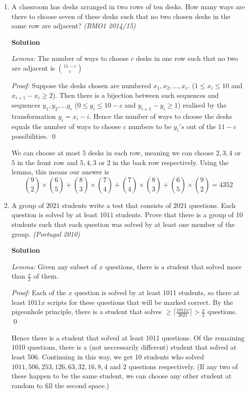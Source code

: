 \documentclass[10pt,a4paper]{article}
\begin{document}
\begin{enumerate}
\item A classroom has desks arranged in two rows of ten desks. How many ways are there to choose seven of these desks such that no two chosen desks in the same row are adjacent?
\textit{(BMO1 2014/15)}

\textbf{Solution} 

\textit{Lemma:} The number of ways to choose $c$ desks in one row such that no two are adjacent is $\binom{11-c}{c}$

\textit{Proof:} Suppose the desks chosen are numbered $x_1, x_2, ..., x_c$. ($1\leq x_i \leq 10$ and $x_{i+1}-x_i \geq 2$). Then there is a bijection between such sequences and sequences $y_1, y_2, ... y_c$  ($0\leq y_i\leq10-c$ and $y_{i+1}-y_i \geq1$) realised by the transformation $y_i = x_i - i$. Hence the number of ways to choose the desks equals the number of ways to choose $c$ numbers to be $y_i's$ out of the $11-c$ possibilities. \qed

We can choose at most $5$ desks in each row, meaning we can choose $2,3,4$ or $5$ in the front row and $5,4,3$ or $2$ in the back row respectively. Using the lemma, this means our answer is $$\binom{9}{2}\times\binom{6}{5} +  \binom{8}{3}\times\binom{7}{4} + \binom{7}{4}\times\binom{8}{3} + \binom{6}{5}\times\binom{9}{2} = 4352$$

\item A group of $2021$ students write a test that consists of $2021$ questions. Each question is solved by at least $1011$ students. Prove that there is a group of 10 students such that each question was solved by at least one member of the group.
\textit{(Portugal 2010)}

\textbf{Solution}

\textit{Lemma:} Given any subset of $x$ questions, there is a student that solved more than $\frac{x}{2}$ of them. 

\textit{Proof:} Each of the $x$ question is solved by at least 1011 students, so there at least $1011x$ scripts for these questions that will be marked correct. By the pigeonhole principle, there is a student that solves $\geq \lceil\frac{1011x}{2021}\rceil > \frac{x}{2}$ questions. \qed

Hence there is a student that solved at least 1011 questions. Of the remaining 1010 questions, there is a (not neccessarily different) student that solved at least 506. Continuing in this way, we get 10 students who solved $1011,506,253,126,63,32,16,8,4$ and $2$ questions respectively. (If any two of these happen to be the same student, we can choose any other student at random to fill the second space.)


\end{enumerate}
\end{document}
